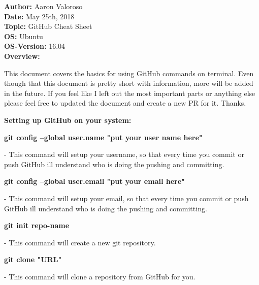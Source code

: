 \documentclass[11pt, a4papper]{article}
\begin{document}
\noindent\textbf{Author: } Aaron Valoroso \\
\textbf{Date: } May 25th, 2018 \\
\textbf{Topic: } GitHub Cheat Sheet \\
\textbf{OS: } Ubuntu \\
\textbf{OS-Version: } 16.04 \\[1cm]

\textbf{Overview: } \\
\begin{adjustwidth}{3cm}{} 
This document covers the basics for using GitHub commands on terminal. Even though that this document is pretty short with information, more will be added in the future. If you feel like I left out the most important parts or anything else please feel free to updated the document and create a new PR for it. Thanks. \\
\end{adjustwidth}
\indent \indent \textbf{Setting up GitHub on your system:} \\
\begin{adjustwidth}{3cm}{} 

\textbf{git config --global user.name "put your user name here"}
\begin{adjustwidth}{1cm}{} 
- This command will setup your username, so that every time you commit or push GitHub ill understand who is doing the pushing and committing.
\end{adjustwidth}

\noindent \textbf{git config --global user.email "put your email here"}
\begin{adjustwidth}{1cm}{} 
- This command will setup your email, so that every time you commit or push GitHub ill understand who is doing the pushing and committing.
\end{adjustwidth}

\noindent \textbf{git init repo-name}
\begin{adjustwidth}{1cm}{} 
- This command will create a new git repository.
\end{adjustwidth}

\noindent \textbf{git clone "URL"}
\begin{adjustwidth}{1cm}{} 
- This command will clone a repository from GitHub for you. \\
\end{adjustwidth}

\end{adjustwidth}
\end{document}
